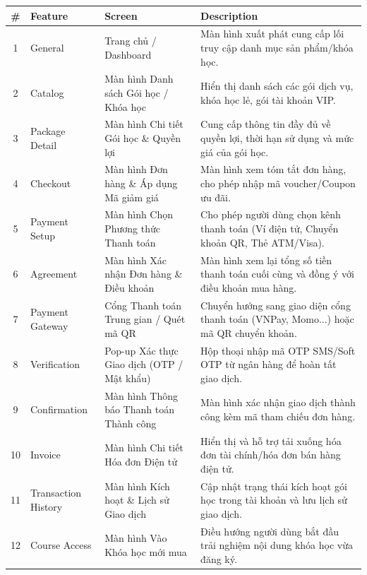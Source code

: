 \clearpage %

\renewcommand{\arraystretch}{1.25}
\begin{longtable}{|c|p{2.8cm}|p{4.2cm}|p{6.5cm}|}
	\hline
	\rowcolor{tableheader}
	\textbf{\#} & \textbf{Feature} & \textbf{Screen} & \textbf{Description} \\ \hline
	\endfirsthead
	1 & General & Trang chủ / Dashboard & Màn hình xuất phát cung cấp lối truy cập danh mục sản phẩm/khóa học. \\ \hline
	2 & Catalog & Màn hình Danh sách Gói học / Khóa học & Hiển thị danh sách các gói dịch vụ, khóa học lẻ, gói tài khoản VIP. \\ \hline
	3 & Package Detail & Màn hình Chi tiết Gói học \& Quyền lợi & Cung cấp thông tin đầy đủ về quyền lợi, thời hạn sử dụng và mức giá của gói học. \\ \hline
	4 & Checkout & Màn hình Đơn hàng \& Áp dụng Mã giảm giá & Màn hình xem tóm tắt đơn hàng, cho phép nhập mã voucher/Coupon ưu đãi. \\ \hline
	5 & Payment Setup & Màn hình Chọn Phương thức Thanh toán & Cho phép người dùng chọn kênh thanh toán (Ví điện tử, Chuyển khoản QR, Thẻ ATM/Visa). \\ \hline
	6 & Agreement & Màn hình Xác nhận Đơn hàng \& Điều khoản & Màn hình xem lại tổng số tiền thanh toán cuối cùng và đồng ý với điều khoản mua hàng. \\ \hline
	7 & Payment Gateway & Cổng Thanh toán Trung gian / Quét mã QR & Chuyển hướng sang giao diện cổng thanh toán (VNPay, Momo...) hoặc mã QR chuyển khoản. \\ \hline
	8 & Verification & Pop-up Xác thực Giao dịch (OTP / Mật khẩu) & Hộp thoại nhập mã OTP SMS/Soft OTP từ ngân hàng để hoàn tất giao dịch. \\ \hline
	9 & Confirmation & Màn hình Thông báo Thanh toán Thành công & Màn hình xác nhận giao dịch thành công kèm mã tham chiếu đơn hàng. \\ \hline
	10 & Invoice & Màn hình Chi tiết Hóa đơn Điện tử & Hiển thị và hỗ trợ tải xuống hóa đơn tài chính/hóa đơn bán hàng điện tử. \\ \hline
	11 & Transaction History & Màn hình Kích hoạt \& Lịch sử Giao dịch & Cập nhật trạng thái kích hoạt gói học trong tài khoản và lưu lịch sử giao dịch. \\ \hline
	12 & Course Access & Màn hình Vào Khóa học mới mua & Điều hướng người dùng bắt đầu trải nghiệm nội dung khóa học vừa đăng ký. \\ \hline
\end{longtable}



